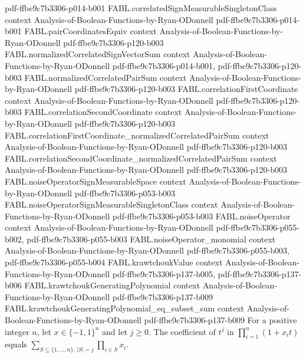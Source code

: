 \begin{theorem}
  {pdf-ffbe9c7b3306-p014-b001}
\proofstep
  {FABL.correlatedSignMeasurableSingletonClass}
  {context}
  {Analysis-of-Boolean-Functions-by-Ryan-ODonnell}
  {pdf-ffbe9c7b3306-p014-b001}
\proofstep
  {FABL.pairCoordinatesEquiv}
  {context}
  {Analysis-of-Boolean-Functions-by-Ryan-ODonnell}
  {pdf-ffbe9c7b3306-p120-b003}
\proofstep
  {FABL.normalizedCorrelatedSignVectorSum}
  {context}
  {Analysis-of-Boolean-Functions-by-Ryan-ODonnell}
  {pdf-ffbe9c7b3306-p014-b001,
    pdf-ffbe9c7b3306-p120-b003}
\proofstep
  {FABL.normalizedCorrelatedPairSum}
  {context}
  {Analysis-of-Boolean-Functions-by-Ryan-ODonnell}
  {pdf-ffbe9c7b3306-p120-b003}
\proofstep
  {FABL.correlationFirstCoordinate}
  {context}
  {Analysis-of-Boolean-Functions-by-Ryan-ODonnell}
  {pdf-ffbe9c7b3306-p120-b003}
\proofstep
  {FABL.correlationSecondCoordinate}
  {context}
  {Analysis-of-Boolean-Functions-by-Ryan-ODonnell}
  {pdf-ffbe9c7b3306-p120-b003}
\proofstep
  {FABL.correlationFirstCoordinate_normalizedCorrelatedPairSum}
  {context}
  {Analysis-of-Boolean-Functions-by-Ryan-ODonnell}
  {pdf-ffbe9c7b3306-p120-b003}
\proofstep
  {FABL.correlationSecondCoordinate_normalizedCorrelatedPairSum}
  {context}
  {Analysis-of-Boolean-Functions-by-Ryan-ODonnell}
  {pdf-ffbe9c7b3306-p120-b003}
\proofstep
  {FABL.noiseOperatorSignMeasurableSpace}
  {context}
  {Analysis-of-Boolean-Functions-by-Ryan-ODonnell}
  {pdf-ffbe9c7b3306-p053-b003}
\proofstep
  {FABL.noiseOperatorSignMeasurableSingletonClass}
  {context}
  {Analysis-of-Boolean-Functions-by-Ryan-ODonnell}
  {pdf-ffbe9c7b3306-p053-b003}
\proofstep
  {FABL.noiseOperator}
  {context}
  {Analysis-of-Boolean-Functions-by-Ryan-ODonnell}
  {pdf-ffbe9c7b3306-p055-b002,
    pdf-ffbe9c7b3306-p055-b003}
\proofstep
  {FABL.noiseOperator_monomial}
  {context}
  {Analysis-of-Boolean-Functions-by-Ryan-ODonnell}
  {pdf-ffbe9c7b3306-p055-b003,
    pdf-ffbe9c7b3306-p055-b004}
\proofstep
  {FABL.krawtchoukValue}
  {context}
  {Analysis-of-Boolean-Functions-by-Ryan-ODonnell}
  {pdf-ffbe9c7b3306-p137-b005,
    pdf-ffbe9c7b3306-p137-b006}
\proofstep
  {FABL.krawtchoukGeneratingPolynomial}
  {context}
  {Analysis-of-Boolean-Functions-by-Ryan-ODonnell}
  {pdf-ffbe9c7b3306-p137-b009}
\proofstep
  {FABL.krawtchoukGeneratingPolynomial_eq_subset_sum}
  {context}
  {Analysis-of-Boolean-Functions-by-Ryan-ODonnell}
  {pdf-ffbe9c7b3306-p137-b009}
For a positive integer $n$, let $x\in\{-1,1\}^n$ and let $j\ge 0$. The coefficient of
$t^j$ in $\prod_{i=1}^n(1+x_i t)$ equals
$\sum_{S\subseteq\{1,\ldots,n\},\,|S|=j}\prod_{i\in S}x_i$.
\end{theorem}

